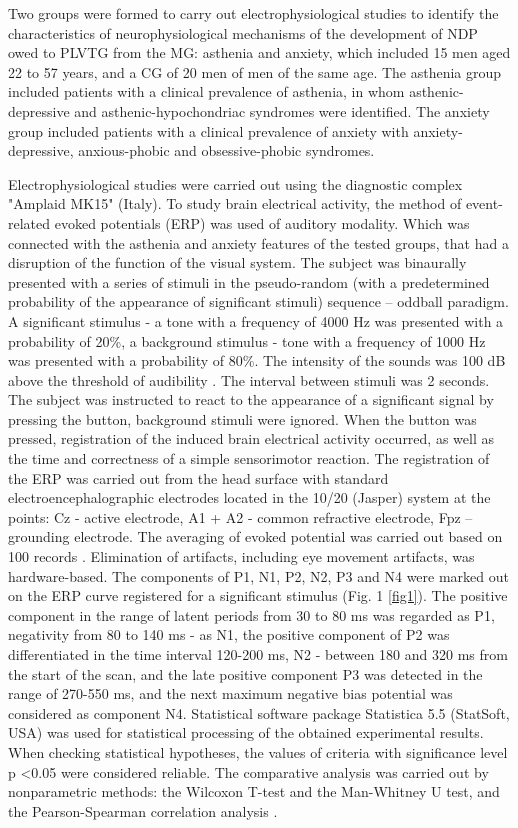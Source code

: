 \documentclass[twocolumn]{article}
\begin{document}
\par Two groups were formed to carry out electrophysiological studies to identify the characteristics of neurophysiological mechanisms of the development of NDP owed to PLVTG from the MG: asthenia and anxiety, which included 15 men aged 22 to 57 years, and a CG of 20 men of men of the same age. The asthenia group included patients with a clinical prevalence of asthenia, in whom asthenic-depressive and asthenic-hypochondriac syndromes were identified. The anxiety group included patients with a clinical prevalence of anxiety with anxiety-depressive, anxious-phobic and obsessive-phobic syndromes. 
\par Electrophysiological studies were carried out using the diagnostic complex "Amplaid MK15" (Italy). To study brain electrical activity, the method of event-related evoked potentials (ERP) was used of auditory modality. Which was connected with the asthenia and anxiety features of the tested groups, that had a disruption of the function of the visual system. The subject was binaurally presented with a series of stimuli in the pseudo-random (with a predetermined probability of the appearance of significant stimuli) sequence – oddball paradigm. A significant stimulus - a tone with a frequency of 4000 Hz was presented with a probability of 20\%, a background stimulus - tone with a frequency of 1000 Hz was presented with a probability of 80\%. The intensity of the sounds was 100 dB above the threshold of audibility \cite{bib12}. The interval between stimuli was 2 seconds. The subject was instructed to react to the appearance of a significant signal by pressing the button, background stimuli were ignored. When the button was pressed, registration of the induced brain electrical activity occurred, as well as the time and correctness of a simple sensorimotor reaction. The registration of the ERP was carried out from the head surface with standard electroencephalographic electrodes located in the 10/20 (Jasper) system at the points: Cz - active electrode, A1 + A2 - common refractive electrode, Fpz – grounding electrode. The averaging of evoked potential was carried out based on 100 records \cite{bib13}. Elimination of artifacts, including eye movement artifacts, was hardware-based. The components of P1, N1, P2, N2, P3 and N4 were marked out on the ERP curve registered for a significant stimulus (Fig. 1 \ref{fig1}). The positive component in the range of latent periods from 30 to 80 ms was regarded as P1, negativity from 80 to 140 ms - as N1, the positive component of P2 was differentiated in the time interval 120-200 ms, N2 - between 180 and 320 ms from the start of the scan, and the late positive component P3 was detected in the range of 270-550 ms, and the next maximum negative bias potential was considered as component N4. Statistical software package Statistica 5.5 (StatSoft, USA) was used for statistical processing of the obtained experimental results. When checking statistical hypotheses, the values of criteria with significance level p \textless{}0.05 were considered reliable. The comparative analysis was carried out by nonparametric methods: the Wilcoxon T-test and the Man-Whitney U test, and the Pearson-Spearman correlation analysis \cite{bib14}.
\end{document}
